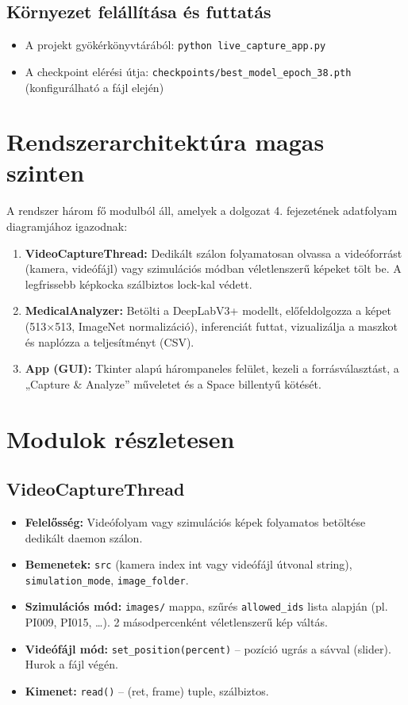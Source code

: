 \documentclass[12pt, a4paper]{report}
\begin{document}
\subsection{Környezet felállítása és futtatás}
\begin{itemize}
    \item A projekt gyökérkönyvtárából: \texttt{python live\_capture\_app.py}
    \item A checkpoint elérési útja: \texttt{checkpoints/best\_model\_epoch\_38.pth} (konfigurálható a fájl elején)
\end{itemize}

\section{Rendszerarchitektúra magas szinten}

A rendszer három fő modulból áll, amelyek a dolgozat 4. fejezetének adatfolyam diagramjához igazodnak:

\begin{enumerate}
    \item \textbf{VideoCaptureThread:} Dedikált szálon folyamatosan olvassa a videóforrást (kamera, videófájl) vagy szimulációs módban véletlenszerű képeket tölt be. A legfrissebb képkocka szálbiztos lock-kal védett.
    \item \textbf{MedicalAnalyzer:} Betölti a DeepLabV3+ modellt, előfeldolgozza a képet (513×513, ImageNet normalizáció), inferenciát futtat, vizualizálja a maszkot és naplózza a teljesítményt (CSV).
    \item \textbf{App (GUI):} Tkinter alapú hárompaneles felület, kezeli a forrásválasztást, a „Capture \& Analyze” műveletet és a Space billentyű kötését.
\end{enumerate}

\section{Modulok részletesen}

\subsection{VideoCaptureThread}
\begin{itemize}
    \item \textbf{Felelősség:} Videófolyam vagy szimulációs képek folyamatos betöltése dedikált daemon szálon.
    \item \textbf{Bemenetek:} \texttt{src} (kamera index int vagy videófájl útvonal string), \texttt{simulation\_mode}, \texttt{image\_folder}.
    \item \textbf{Szimulációs mód:} \texttt{images/} mappa, szűrés \texttt{allowed\_ids} lista alapján (pl. PI009, PI015, …). 2 másodpercenként véletlenszerű kép váltás.
    \item \textbf{Videófájl mód:} \texttt{set\_position(percent)} – pozíció ugrás a sávval (slider). Hurok a fájl végén.
    \item \textbf{Kimenet:} \texttt{read()} – (ret, frame) tuple, szálbiztos.
\end{itemize}
\end{document}
